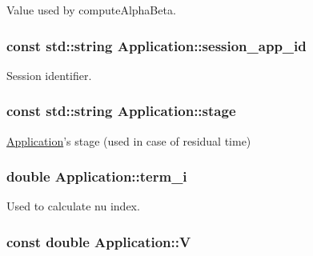 Value used by compute\-Alpha\-Beta. 

\hypertarget{classApplication_a6152c40564d526b9b60871c98f7a51c7}{
\subsubsection[{session\-\_\-app\-\_\-id}]{\setlength{\rightskip}{0pt plus 5cm}const std\-::string Application\-::session\-\_\-app\-\_\-id\hspace{0.3cm}{\ttfamily [private]}}}\label{classApplication_a6152c40564d526b9b60871c98f7a51c7}


Session identifier. 

\hypertarget{classApplication_a27731ed4d16f6e9583b52c4f09a69258}{
\subsubsection[{stage}]{\setlength{\rightskip}{0pt plus 5cm}const std\-::string Application\-::stage\hspace{0.3cm}{\ttfamily [private]}}}\label{classApplication_a27731ed4d16f6e9583b52c4f09a69258}


\hyperlink{classApplication}{Application}'s stage (used in case of residual time) 

\hypertarget{classApplication_ad5486702327ad61e56ed04fb54d58c20}{
\subsubsection[{term\-\_\-i}]{\setlength{\rightskip}{0pt plus 5cm}double Application\-::term\-\_\-i\hspace{0.3cm}{\ttfamily [private]}}}\label{classApplication_ad5486702327ad61e56ed04fb54d58c20}


Used to calculate nu index. 

\hypertarget{classApplication_a03a99fa3553c376653e53bb5f489c316}{
\subsubsection[{V}]{\setlength{\rightskip}{0pt plus 5cm}const double Application\-::\-V\hspace{0.3cm}{\ttfamily [private]}}}\label{classApplication_a03a99fa3553c376653e53bb5f489c316}


